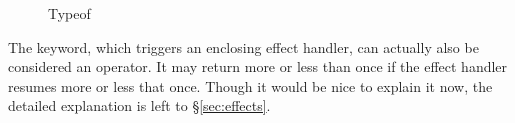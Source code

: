 \begin{figure}[h]
{\begin{prooftree}
        \end{prooftree}
    }
    \parbox[t]{0.48\linewidth}{
        \begin{prooftree}
        \end{prooftree}
    }
    \parbox[t]{0.48\linewidth}{
        \begin{prooftree}
        \end{prooftree}
    }
    \parbox[t]{0.48\linewidth}{
        \begin{prooftree}
        \end{prooftree}
    }
    \parbox[t]{0.48\linewidth}{
        \begin{prooftree}
        \end{prooftree}
    }
    \parbox[t]{0.48\linewidth}{
        \begin{prooftree}
        \end{prooftree}
    }
    \parbox[t]{0.48\linewidth}{
        \begin{prooftree}
        \end{prooftree}
    }
    \parbox[t]{0.48\linewidth}{
        \begin{prooftree}
        \end{prooftree}
    }
    \caption{\label{fig:typeof}Typeof}
\end{figure}

The  keyword, which triggers an enclosing effect handler, can actually also be
considered an operator. It may return more or less than once if the effect handler resumes
more or less that once. Though it would be nice to explain it now, the detailed explanation
is left to \S\ref{sec:effects}.

\FloatBarrier
